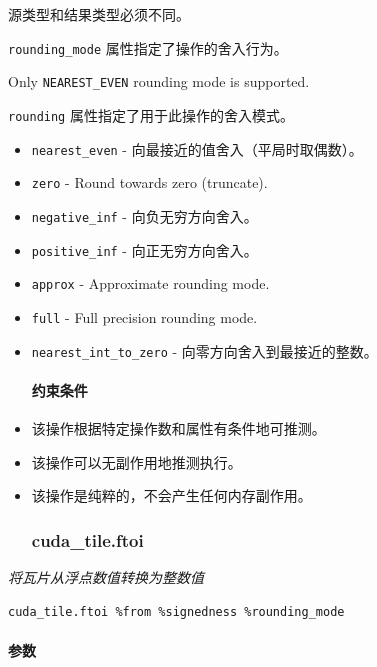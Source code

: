 \documentclass{article}
\begin{document}
源类型和结果类型必须不同。


\texttt{rounding\_mode} 属性指定了操作的舍入行为。

Only \texttt{NEAREST\_EVEN} rounding mode is supported.


\texttt{rounding} 属性指定了用于此操作的舍入模式。


\begin{itemize}
\item \texttt{nearest\_even} - 向最接近的值舍入（平局时取偶数）。
\item \texttt{zero} - Round towards zero (truncate).
\item \texttt{negative\_inf} - 向负无穷方向舍入。
\item \texttt{positive\_inf} - 向正无穷方向舍入。
\item \texttt{approx} - Approximate rounding mode.
\item \texttt{full} - Full precision rounding mode.
\item \texttt{nearest\_int\_to\_zero} - 向零方向舍入到最接近的整数。


\paragraph{约束条件}

\item 该操作根据特定操作数和属性有条件地可推测。
\item 该操作可以无副作用地推测执行。
\item 该操作是纯粹的，不会产生任何内存副作用。


\subsubsection{cuda\_tile.ftoi}

\end{itemize}
\textit{将瓦片从浮点数值转换为整数值}


\begin{lstlisting}
cuda_tile.ftoi %from %signedness %rounding_mode
\end{lstlisting}

\paragraph{参数}
\end{document}
